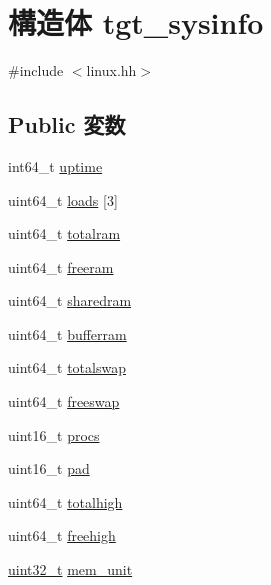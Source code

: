\hypertarget{structArmLinux64_1_1tgt__sysinfo}{
\section{構造体 tgt\_\-sysinfo}
\label{structArmLinux64_1_1tgt__sysinfo}
}


{\ttfamily \#include $<$linux.hh$>$}\subsection*{Public 変数}
\begin{DoxyCompactItemize}
\item 
int64\_\-t \hyperlink{structArmLinux64_1_1tgt__sysinfo_a382d83f87fed25a254be85c2a0b40b03}{uptime}
\item 
uint64\_\-t \hyperlink{structArmLinux64_1_1tgt__sysinfo_a95d978a7f51e209ea54047e78009854c}{loads} \mbox{[}3\mbox{]}
\item 
uint64\_\-t \hyperlink{structArmLinux64_1_1tgt__sysinfo_a4e4ed68dad22afd974a82cbc557525dc}{totalram}
\item 
uint64\_\-t \hyperlink{structArmLinux64_1_1tgt__sysinfo_a8d4aff288f72e1ea564526238e367f15}{freeram}
\item 
uint64\_\-t \hyperlink{structArmLinux64_1_1tgt__sysinfo_abdb4b62061eb42f493e076e2da58629e}{sharedram}
\item 
uint64\_\-t \hyperlink{structArmLinux64_1_1tgt__sysinfo_a7b50bd38fd6394e41002d6efeb6c48ee}{bufferram}
\item 
uint64\_\-t \hyperlink{structArmLinux64_1_1tgt__sysinfo_a083d391d3cd3c507c32c0b3967fdb33c}{totalswap}
\item 
uint64\_\-t \hyperlink{structArmLinux64_1_1tgt__sysinfo_aa14ddcd7f78dfc548e6ac7dc45590914}{freeswap}
\item 
uint16\_\-t \hyperlink{structArmLinux64_1_1tgt__sysinfo_ac4cd695f031bf46897d4f91030502677}{procs}
\item 
uint16\_\-t \hyperlink{structArmLinux64_1_1tgt__sysinfo_a29720fa149448a5be70ff846b72c6dde}{pad}
\item 
uint64\_\-t \hyperlink{structArmLinux64_1_1tgt__sysinfo_a7ff1331076cc5137154b37a7d7c1aca8}{totalhigh}
\item 
uint64\_\-t \hyperlink{structArmLinux64_1_1tgt__sysinfo_a0c4ceae795991c90aadac0074c0a2268}{freehigh}
\item 
\hyperlink{Type_8hh_a435d1572bf3f880d55459d9805097f62}{uint32\_\-t} \hyperlink{structArmLinux64_1_1tgt__sysinfo_a366fbac3c8975125328518d2d3598576}{mem\_\-unit}
\end{DoxyCompactItemize}


